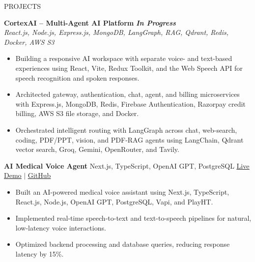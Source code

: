 \documentclass{resume}
\begin{document}
\begin{rSection}{PROJECTS}

\textbf{CortexAI -- Multi-Agent AI Platform} \hfill \textit{\textbf{In Progress}} \\
\textit{React.js, Node.js, Express.js, MongoDB, LangGraph, RAG, Qdrant, Redis, Docker, AWS S3}

\begin{itemize}[left=0em,label=\textbullet,itemsep=-0.55em]
\item Building a responsive AI workspace with separate voice- and text-based experiences using React, Vite, Redux Toolkit, and the Web Speech API for speech recognition and spoken responses.
\item Architected gateway, authentication, chat, agent, and billing microservices with Express.js, MongoDB, Redis, Firebase Authentication, Razorpay credit billing, AWS S3 file storage, and Docker.
\item Orchestrated intelligent routing with LangGraph across chat, web-search, coding, PDF/PPT, vision, and PDF-RAG agents using LangChain, Qdrant vector search, Groq, Gemini, OpenRouter, and Tavily.
\end{itemize}

\smallskip

\textbf{AI Medical Voice Agent}
\quad Next.js, TypeScript, OpenAI GPT, PostgreSQL
\hfill
\href{https://ai-medical-voice-agent-v2-peach.vercel.app/}{\underline{Live Demo}}
$\vert$
\href{https://github.com/codeVedang/ai-medical-voice-agent-v2}{\underline{GitHub}}

\begin{itemize}[left=0em,label=\textbullet,itemsep=-0.55em]
\item Built an AI-powered medical voice assistant using Next.js, TypeScript, React.js, Node.js, OpenAI GPT, PostgreSQL, Vapi, and PlayHT.
\item Implemented real-time speech-to-text and text-to-speech pipelines for natural, low-latency voice interactions.
\item Optimized backend processing and database queries, reducing response latency by 15\%.
\end{itemize}

\end{rSection}

\end{document}
